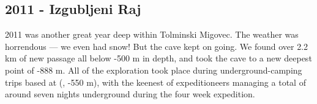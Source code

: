 \begin{tcolorbox}
\chapter{2011 - Izgubljeni Raj}

2011 was another great year deep within Tolminski Migovec. The weather
was horrendous --- we even had snow! But the cave kept on going. We
found over 2.2 km of new passage all below -500 m in depth, and took the
cave to a new deepest point of -888 m. All of the exploration took place
during underground-camping trips based at 
(, -550 m), with the keenest of expeditioneers managing
a total of around seven nights underground during the four week
expedition.

\end{tcolorbox}
\BgThispage









